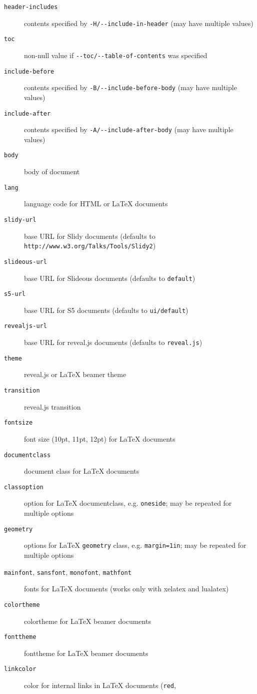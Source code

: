 \documentclass[]{article}
\begin{document}
\begin{description}
\item[\texttt{header-includes}]
contents specified by \texttt{-H/-{}-include-in-header} (may have
multiple values)
\item[\texttt{toc}]
non-null value if \texttt{-{}-toc/-{}-table-of-contents} was specified
\item[\texttt{include-before}]
contents specified by \texttt{-B/-{}-include-before-body} (may have
multiple values)
\item[\texttt{include-after}]
contents specified by \texttt{-A/-{}-include-after-body} (may have
multiple values)
\item[\texttt{body}]
body of document
\item[\texttt{lang}]
language code for HTML or LaTeX documents
\item[\texttt{slidy-url}]
base URL for Slidy documents (defaults to
\texttt{http://www.w3.org/Talks/Tools/Slidy2})
\item[\texttt{slideous-url}]
base URL for Slideous documents (defaults to \texttt{default})
\item[\texttt{s5-url}]
base URL for S5 documents (defaults to \texttt{ui/default})
\item[\texttt{revealjs-url}]
base URL for reveal.js documents (defaults to \texttt{reveal.js})
\item[\texttt{theme}]
reveal.js or LaTeX beamer theme
\item[\texttt{transition}]
reveal.js transition
\item[\texttt{fontsize}]
font size (10pt, 11pt, 12pt) for LaTeX documents
\item[\texttt{documentclass}]
document class for LaTeX documents
\item[\texttt{classoption}]
option for LaTeX documentclass, e.g. \texttt{oneside}; may be repeated
for multiple options
\item[\texttt{geometry}]
options for LaTeX \texttt{geometry} class, e.g. \texttt{margin=1in}; may
be repeated for multiple options
\item[\texttt{mainfont}, \texttt{sansfont}, \texttt{monofont},
\texttt{mathfont}]
fonts for LaTeX documents (works only with xelatex and lualatex)
\item[\texttt{colortheme}]
colortheme for LaTeX beamer documents
\item[\texttt{fonttheme}]
fonttheme for LaTeX beamer documents
\item[\texttt{linkcolor}]
color for internal links in LaTeX documents (\texttt{red},

\end{description}
\end{document}
